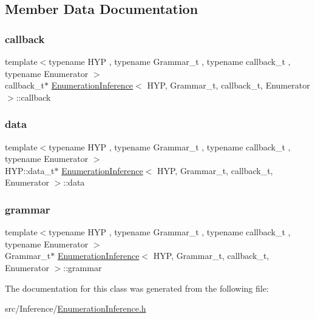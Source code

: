 \subsection{Member Data Documentation}
\mbox{\label{class_enumeration_inference_a25d87b73385c434bdc34192b3408c0d0}} 
\subsubsection{\texorpdfstring{callback}{callback}}
{\footnotesize\ttfamily template$<$typename H\+YP , typename Grammar\+\_\+t , typename callback\+\_\+t , typename Enumerator $>$ \\
callback\+\_\+t$\ast$ \hyperlink{class_enumeration_inference}{Enumeration\+Inference}$<$ H\+YP, Grammar\+\_\+t, callback\+\_\+t, Enumerator $>$\+::callback}

\mbox{\label{class_enumeration_inference_a04537935bdd05d4320a51b15ddbca015}} 
\subsubsection{\texorpdfstring{data}{data}}
{\footnotesize\ttfamily template$<$typename H\+YP , typename Grammar\+\_\+t , typename callback\+\_\+t , typename Enumerator $>$ \\
H\+Y\+P\+::data\+\_\+t$\ast$ \hyperlink{class_enumeration_inference}{Enumeration\+Inference}$<$ H\+YP, Grammar\+\_\+t, callback\+\_\+t, Enumerator $>$\+::data}

\mbox{\label{class_enumeration_inference_aa39598587ac2d15550f8f9c6ca0c7089}} 
\subsubsection{\texorpdfstring{grammar}{grammar}}
{\footnotesize\ttfamily template$<$typename H\+YP , typename Grammar\+\_\+t , typename callback\+\_\+t , typename Enumerator $>$ \\
Grammar\+\_\+t$\ast$ \hyperlink{class_enumeration_inference}{Enumeration\+Inference}$<$ H\+YP, Grammar\+\_\+t, callback\+\_\+t, Enumerator $>$\+::grammar}



The documentation for this class was generated from the following file\+:\begin{DoxyCompactItemize}
\item 
src/\+Inference/\hyperlink{_inference_2_enumeration_inference_8h}{Enumeration\+Inference.\+h}\end{DoxyCompactItemize}
